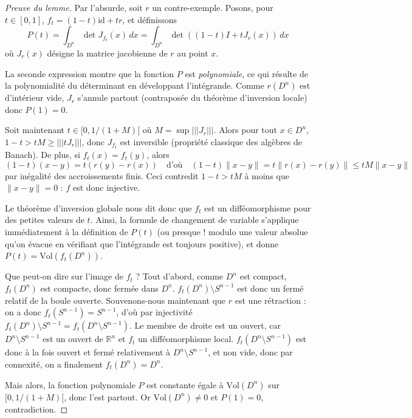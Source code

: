 \documentclass[a4paper, 11pt]{article}
\def\R{\mathbb{R}}
\def\Vol{\mathrm{Vol}}
\begin{document}
\begin{proof}[Preuve du lemme]
  Par l'absurde, soit $r$ un contre-exemple.  
  Posons, pour $t \in [0,1]$, $f_t = (1-t)\mathrm{id} + tr$, et définissons
  \[ P(t) = \int_{D^n} \det J_{f_t}(x)\,dx = \int_{D^n} \det ((1-t)I +
    tJ_r(x))\,dx \]
  où $J_r(x)$ désigne la matrice jacobienne de $r$ au point $x$.

  La seconde expression montre que la fonction $P$ est \emph{polynomiale}, ce
  qui résulte de la polynomialité du déterminant en développant l'intégrande.
  Comme $r(D^n)$ est d'intérieur vide, $J_r$ s'annule partout (contraposée du
  théorème d'inversion locale) donc $P(1) = 0$.

  Soit maintenant $t \in [0,1/(1+M)[$ où $M = \sup |||J_r|||$. Alors pour tout
  $x \in D^n$, $1-t > tM \geq |||tJ_r|||$, donc $J_{f_t}$ est inversible
  (propriété classique des algèbres de Banach). De plus, si $f_t(x) = f_t(y)$,
  alors
  \[(1-t)(x-y) = t(r(y) - r(x)) \quad \text{d'où} \quad
    (1-t)\|x-y\| = t\|r(x) - r(y)\| \leq tM\|x-y\| \]
  par inégalité des accroissements finis. Ceci contredit $1-t > tM$
  à moins que $\|x-y\| = 0$ : $f$ est donc injective.

  Le théorème d'inversion globale nous dit donc que $f_t$ est un difféomorphisme
  pour des petites valeurs de $t$. Ainsi, la formule de changement de variable
  s'applique immédiatement à la définition de $P(t)$ (ou presque ! modulo une
  valeur absolue qu'on évacue en vérifiant que l'intégrande est toujours
  positive), et donne $P(t) = \Vol(f_t(D^n))$.

  Que peut-on dire sur l'image de $f_t$ ? Tout d'abord, comme $D^n$ est compact,
  $f_t(D^n)$ est compacte, donc fermée dans $D^n$. $f_t(D^n)\setminus S^{n-1}$
  est donc un fermé relatif de la boule ouverte. Souvenons-nous maintenant que
  $r$ est une rétraction : on a donc $f_t(S^{n-1}) = S^{n-1}$, d'où par
  injectivité $f_t(D^n)\setminus S^{n-1} = f_t(D^n \setminus S^{n-1})$. Le
  membre de droite est un ouvert, car $D^n \setminus S^{n-1}$ est un ouvert de
  $\R^n$ et $f_t$ un difféomorphisme local. $f_t(D^n\setminus S^{n-1})$ est donc
  à la fois ouvert et fermé relativement à $D^n \setminus S^{n-1}$, et non vide,
  donc par connexité, on a finalement $f_t(D^n) = D^n$.

  Mais alors, la fonction polynomiale $P$ est constante égale à $\Vol(D^n)$ sur
  $[0,1/(1+M)[$, donc l'est partout. Or $\Vol(D^n) \neq 0$ et $P(1) = 0$,
  contradiction.
\end{proof}
\end{document}
